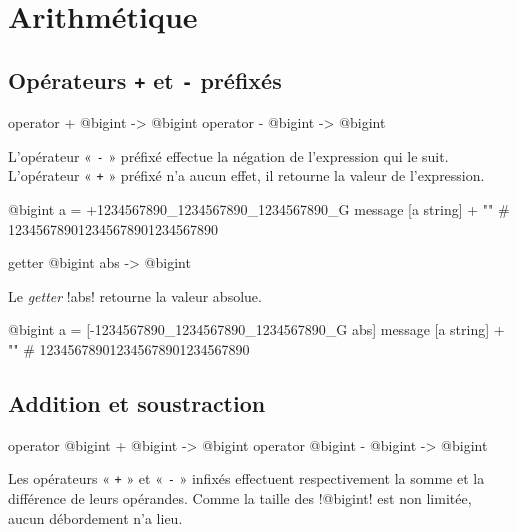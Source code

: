 \section{Arithmétique}


\subsection{Opérateurs \texttt{+} et \texttt{-} préfixés}

\begin{galgas}
operator + @bigint -> @bigint
operator - @bigint -> @bigint
\end{galgas}

L'opérateur « \texttt{-} » préfixé effectue la négation de l'expression qui le suit. L'opérateur « \texttt{+} » préfixé n'a aucun effet, il retourne la valeur de l'expression.

\begin{galgas}
@bigint a = +1234567890_1234567890_1234567890_G
message [a string] + "\n" # 123456789012345678901234567890
\end{galgas}










\begin{galgas}
getter @bigint abs -> @bigint
\end{galgas}

Le \emph{getter} \ggs!abs! retourne la valeur absolue.

\begin{galgas}
@bigint a = [-1234567890_1234567890_1234567890_G abs]
message [a string] + "\n" # 123456789012345678901234567890
\end{galgas}






\subsection{Addition et soustraction}

\begin{galgas}
operator @bigint + @bigint -> @bigint
operator @bigint - @bigint -> @bigint
\end{galgas}

Les opérateurs « \texttt{+} » et « \texttt{-} » infixés effectuent respectivement la somme et la différence de leurs opérandes. Comme la taille des \ggs!@bigint! est non limitée, aucun débordement n'a lieu.


